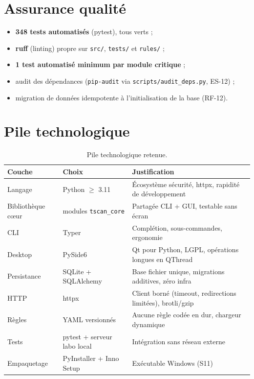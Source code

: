 \documentclass[11pt,a4paper]{report}
\newcommand{\code}[1]{\texttt{#1}}
\begin{document}
\section{Assurance qualité}

\begin{itemize}[leftmargin=1.5em]
  \item \textbf{348 tests automatisés} (pytest), tous verts ;
  \item \textbf{ruff} (linting) propre sur \code{src/}, \code{tests/} et \code{rules/} ;
  \item \textbf{1 test automatisé minimum par module critique} ;
  \item audit des dépendances (\code{pip-audit} via \code{scripts/audit\_deps.py}, ES-12) ;
  \item migration de données idempotente à l'initialisation de la base (RF-12).
\end{itemize}

\section{Pile technologique}

\begin{table}[h!]
\centering
\small
\begin{tabular}{@{}llp{7.5cm}@{}}
\toprule
\textbf{Couche} & \textbf{Choix} & \textbf{Justification} \\
\midrule
Langage & Python $\geq$ 3.11 & Écosystème sécurité, httpx, rapidité de développement \\
Bibliothèque cœur & modules \code{tscan\_core} & Partagée CLI + GUI, testable sans écran \\
CLI & Typer & Complétion, sous-commandes, ergonomie \\
Desktop & PySide6 & Qt pour Python, LGPL, opérations longues en QThread \\
Persistance & SQLite + SQLAlchemy & Base fichier unique, migrations additives, zéro infra \\
HTTP & httpx & Client borné (timeout, redirections limitées), brotli/gzip \\
Règles & YAML versionnés & Aucune règle codée en dur, chargeur dynamique \\
Tests & pytest + serveur labo local & Intégration sans réseau externe \\
Empaquetage & PyInstaller + Inno Setup & Exécutable Windows (S11) \\
\bottomrule
\end{tabular}
\caption{Pile technologique retenue.}
\end{table}
\end{document}

